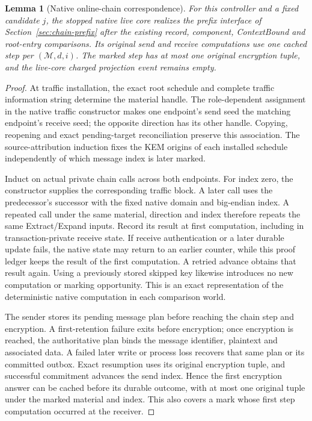 \documentclass[pdflatex]{sn-jnl}
\theoremstyle{thmstyleone}
\newtheorem{lemma}[theorem]{Lemma}
\theoremstyle{thmstylethree}
\theoremstyle{thmstyletwo}
\begin{document}
\begin{lemma}[Native online-chain correspondence]
\label{lem:native-online-chain-correspondence}
For this controller and a fixed candidate $j$, the stopped native live
core realizes the prefix interface of Section~\ref{sec:chain-prefix}
after the existing record, component, ContextBound and root-entry
comparisons. Its original send and receive computations use one cached
step per $(\mathcal M,d,i)$. The marked step has at most one original
encryption tuple, and the live-core charged projection event remains
empty.
\end{lemma}
\begin{proof}
At traffic installation, the exact root schedule and complete traffic
information string determine the material handle. The role-dependent
assignment in the native traffic constructor makes one endpoint's
send seed the matching endpoint's receive seed; the opposite direction
has its other handle. Copying, reopening and exact pending-target
reconciliation preserve this association. The source-attribution
induction fixes the KEM origins of each installed schedule independently
of which message index is later marked.

Induct on actual private chain calls across both endpoints. For index
zero, the constructor supplies the corresponding traffic block. A
later call uses the predecessor's successor with the fixed native
domain and big-endian index. A repeated call under the same material,
direction and index therefore repeats the same Extract/Expand inputs.
Record its result at first computation, including in transaction-private
receive state. If receive authentication or a later durable update
fails, the native state may return to an earlier counter, while this
proof ledger keeps the result of the first computation. A retried advance
obtains that result again. Using a previously stored skipped key likewise
introduces no new computation or marking opportunity. This is an
exact representation of the deterministic native computation in
each comparison world.

The sender stores its pending message plan before reaching the chain
step and encryption. A first-retention failure exits before encryption;
once encryption is reached, the authoritative plan binds the message
identifier, plaintext and associated data. A failed later write or
process loss recovers that same plan or its committed outbox. Exact
resumption uses its original encryption tuple, and successful commitment
advances the send index. Hence the first encryption answer can be
cached before its durable outcome, with at most one original tuple
under the marked material and index. This also covers a mark whose
first step computation occurred at the receiver.


\end{proof}
\end{document}

